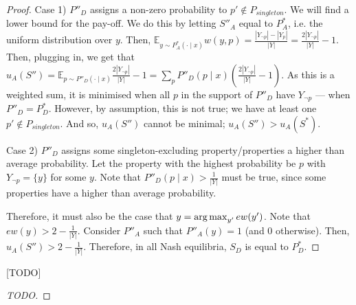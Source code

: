 \begin{proof}
Case 1) $P''_D$ assigns a non-zero probability to $p' \not\in P_\mathit{singleton}$. We will find a lower bound for the pay-off. We do this by letting $S''_A $ equal to $P^*_A$, i.e. the uniform distribution over $y$. Then, $\mathbb{E}_{y \sim P_A^*(\cdot \mid x)}w(y, p) = \frac{|Y_{\neg p}| - |Y_p|}{|Y|} = \frac{2|Y_{\neg p}|}{|Y|} - 1$. %
Then, plugging in, we get that $u_A(S'') = \mathbb{E}_{p \sim P''_D(\cdot \mid x)} \frac{2|Y_{\neg p}|}{|Y|} - 1 = \sum_p P''_D(p \mid x)\left(\frac{2|Y_{\neg p}|}{|Y|} - 1\right)$. As this is a weighted sum, it is minimised when all $p$ in the support of $P''_D$ have $Y_{\neg p}$ --- when $P''_D = P^*_D$. However, by assumption, this is not true; we have at least one $p' \notin P_\mathit{singleton}$. And so, $u_A(S'')$ cannot be minimal; $u_A(S'') > u_A(S^*)$.

Case 2) $P''_D$  assigns some singleton-excluding property/properties a higher than average probability. Let the property with the highest probability be $p$ with $Y_{\neg p} = \{y\}$ for some $y$. Note that $P''_D(p \mid x) > \frac{1}{|Y|}$ must be true, since some properties have a higher than average probability.

Therefore, it must also be the case that $y = \operatorname*{arg\,max}_{y'} ew(y')$. %
Note that $ew(y) > 2 - \frac{1}{|Y|}$. %
Consider $P''_A$ such that $P''_A(y) = 1$ (and $0$ otherwise). Then, $u_A(S'') > 2 - \frac{1}{|Y|}$.
Therefore, in all Nash equilibria, $S_D$ is equal to $P^*_D$.






\end{proof}

\begin{theorem} \label{thm:ipm}
[TODO]%
\end{theorem}
\begin{proof}
[TODO]
\end{proof}